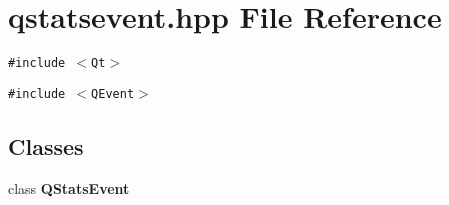 \section{qstatsevent.hpp File Reference}
\label{qstatsevent_8hpp}
{\tt \#include $<$Qt$>$}\par
{\tt \#include $<$QEvent$>$}\par
\subsection*{Classes}
\begin{CompactItemize}
\item 
class {\bf QStats\-Event}
\end{CompactItemize}
